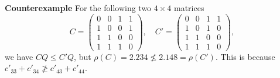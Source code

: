 \documentclass{article}
\begin{document}
{\bf Counterexample}
For the following two $4\times 4$ matrices
$$C=\begin{pmatrix}
0 & 0 & 1 & 1\\
1 & 0 & 0 & 1\\
1 & 1 & 0 & 0\\
1 & 1 & 1 & 0
\end{pmatrix},\quad C'=\begin{pmatrix}
0 & 0 & 1 & 1\\
1 & 0 & 1 &  0\\
1 & 1 & 0 & 0\\
1 & 1 & 1 & 0
\end{pmatrix},$$ 
we have $CQ\leq C'Q$, but 
$\rho(C)=2.234\not\leq 2.148= \rho(C')$. 
This is because $c'_{33}+c'_{34}\not\geq c'_{43}+c'_{44}$. 
\end{document}
